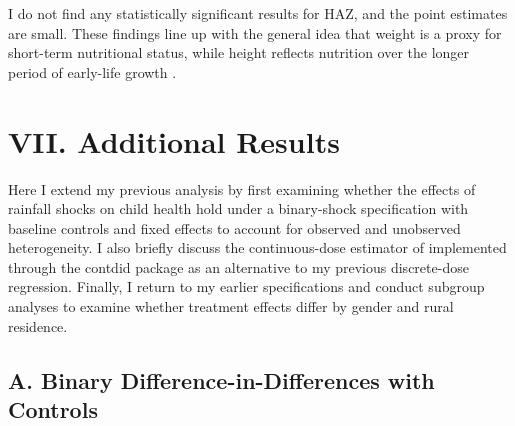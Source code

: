 \documentclass[12pt]{article}
\begin{document}
I do not find any statistically significant results for HAZ, and the point estimates are small. These findings line up with the general idea that weight is a proxy for short-term nutritional status, while height reflects nutrition over the longer period of early-life growth \parencite{currieEarlyLifeHealthAdult2013}.

\section*{VII. Additional Results}\label{sec:VII}

Here I extend my previous analysis by first examining whether the effects of rainfall shocks on child health hold under a binary-shock specification with baseline controls and fixed effects to account for observed and unobserved heterogeneity. I also briefly discuss the continuous-dose estimator of \textcite{callawayDifferenceinDifferencesContinuousTreatment2024} implemented through the contdid package as an alternative to my previous discrete-dose regression. Finally, I return to my earlier specifications and conduct subgroup analyses to examine whether treatment effects differ by gender and rural residence.

\subsection*{A. Binary Difference-in-Differences with Controls}
\end{document}

